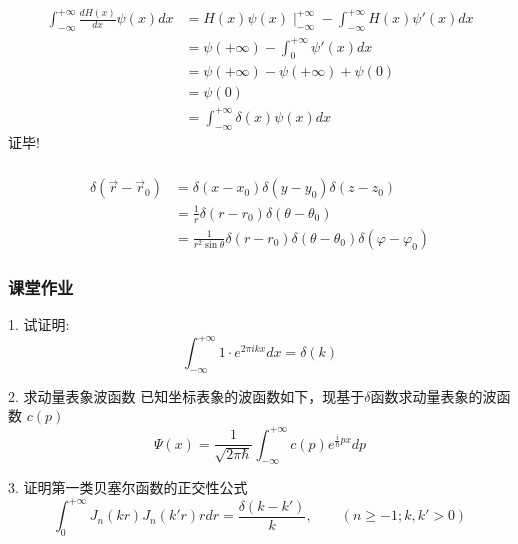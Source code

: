 \begin{frame}
	\frametitle{}
	\证 \[
		\begin{aligned}
		  \int_{-\infty}^{+\infty} \frac{dH(x)}{dx} \psi (x) d x &= H(x) \psi (x)\mid_{-\infty}^{+\infty} - \int_{-\infty}^{+\infty} H(x) \psi' (x) d x \\
		    &=  \psi (+\infty) - \int_{0}^{+\infty} \psi' (x) d x\\
			&=  \psi (+\infty)- \psi (+\infty)+\psi (0)\\
			&=  \psi (0) \\ 
			&=\int_{-\infty}^{+\infty} \delta(x) \psi (x) d x
		\end{aligned}
		   \]
		证毕!
\end{frame}

\begin{frame}
	\frametitle{}
	 \[
		\begin{aligned}
		  \delta (\vec{r}-\vec{r}_0) &=  \delta (x-x_0) \delta (y-y_0) \delta (z-z_0)\\
		  &=  \frac{1}{r}\delta (r-r_0) \delta (\theta -\theta_0) \\
		  &=  \frac{1}{r^2\sin\theta}\delta (r-r_0) \delta (\theta -\theta_0) \delta (\varphi -\varphi_0)
		\end{aligned}
		   \]
\end{frame}

\begin{frame}
	\frametitle{课堂作业}
	 \begin{exampleblock}{1. 试证明:}
	 \[
	\int_{-\infty}^{+\infty} 1 \cdot e^{2\pi i kx} d x = \delta(k)
	\]
	 \end{exampleblock}
	\begin{exampleblock} {2. 求动量表象波函数}
	{已知坐标表象的波函数如下，现基于$\delta$函数求动量表象的波函数 $c(p)$}
		\begin{equation*}
			\Psi(x)=\frac{1}{\sqrt{2\pi \hbar}}  \int_{-\infty}^{+\infty} c(p) e^{\frac{i}{\hbar} px} dp 
		\end{equation*}   	
	\end{exampleblock}
\begin{exampleblock} {3. 证明第一类贝塞尔函数的正交性公式}
	\[\int_{0}^{+\infty} J_n(kr)J_n(k'r) r dr = \frac{\delta(k-k')}{k}, \qquad (n\geq-1; k, k'>0)\] 
	\end{exampleblock}
\end{frame}
